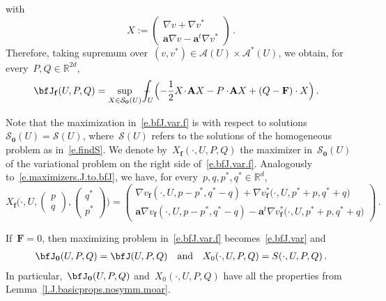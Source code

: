 \documentclass[11pt,twoside]{article} %
\numberwithin{equation}{section}
\theoremstyle{definition}
\newcommand*{\R}{\ensuremath{\mathbb{R}}}
\newcommand*{\Rd}{\ensuremath{\mathbb{R}^d}}
\newcommand{\qand}{\quad \mbox{and} \quad }
\newcommand{\f}{\mathbf{f}}
\renewcommand{\a}{\mathbf{a}}
\newcommand{\bfzero}{\boldsymbol{0}}
\renewcommand{\S}{\mathcal{S}}
\def\Xint#1{\mathchoice
{\XXint\displaystyle\textstyle{#1}}%
{\XXint\textstyle\scriptstyle{#1}}%
{\XXint\scriptstyle\scriptscriptstyle{#1}}%
{\XXint\scriptscriptstyle\scriptscriptstyle{#1}}%
\!\int}
\def\XXint#1#2#3{{\setbox0=\hbox{$#1{#2#3}{\int}$}
\vcenter{\hbox{$#2#3$}}\kern-.5\wd0}}
\def\fint{\Xint-}
\newcommand{\bfA}{\mathbf{A}}
\newcommand{\bfF}{\mathbf{F}}
\begin{document}
with
\begin{equation*} 
X:= \begin{pmatrix} \nabla v{+}\nabla v^*  
\\ \a\nabla v {-} \a^t\nabla v^*  \end{pmatrix}  \,.
\end{equation*}
Therefore,  taking supremum over~$(v,v^*) \in \mathcal{A}(U) \times \mathcal{A}^*(U)$, 
we obtain, for every~$P,Q \in \R^{2d}$, 
\begin{align}
\label{e.bfJ.var.f}
\bfJ_{\f}(U, P,Q )
& 
=
\sup_{X \in \S_{\bfzero}(U)}
\fint_U
\Bigl( -\frac12  X  \! \cdot \! \bfA X - P  \cdot \!\bfA X  + (Q - \bfF)  \cdot  X\Bigr)
\,.
\end{align}

\smallskip

Note that the maximization in~\eqref{e.bfJ.var.f} is with respect to solutions~$\S_{\bfzero}(U) = \S(U)$, 
where~$\S(U)$ refers to the solutions of the homogeneous problem as in~\eqref{e.findS}. We denote by~$X_{\f}(\cdot,U,P,Q)$  the maximizer in~$\S_{\bfzero}(U)$ of the variational problem on the right side of~\eqref{e.bfJ.var.f}. Analogously to~\eqref{e.maximizers.J.to.bfJ}, we have, for every~$p,q,p^*,q^*\in\Rd$, 
\begin{equation}
\label{e.maximizers.J.to.bfJ.f}
X_{\f}
\biggl(\cdot,U, \begin{pmatrix} p  \\ q \end{pmatrix}, \begin{pmatrix} q^* \\ p^* \end{pmatrix} \biggr)
=
\begin{pmatrix} \nabla v_{\f} (\cdot,U,p{-}p^*,q^*{-}q)
+ 
\nabla v_{\f}^*\bigl(\cdot,U,p^*{+}p,q^*{+}q\bigr) \\ 
\a \nabla v_{\f} (\cdot,U,p{-}p^*,q^*{-}q)
- 
\a^t \nabla v_{\f}^*\bigl(\cdot,U,p^*{+}p,q^*{+}q\bigr)
\end{pmatrix}
\,.
\end{equation}


\smallskip

If~$\bfF = 0$, then maximizing problem in~\eqref{e.bfJ.var.f} becomes~\eqref{e.bfJ.var} and
\begin{align*}  
\bfJ_{\bfzero}(U, P,Q ) = \bfJ(U, P,Q )
\qand
X_0(\cdot,U,P,Q) = S(\cdot,U,P,Q) 
\,.
\end{align*}
In particular,~$\bfJ_{\bfzero}(U, P,Q )$ and~$X_0(\cdot,U,P,Q)$ have all the properties from Lemma~\ref{l.J.basicprops.nosymm.moar}. 
\end{document}
